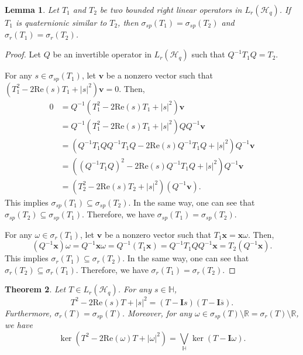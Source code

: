 \documentclass[pdflatex,sn-mathphys-num]{sn-jnl}%
\theoremstyle{thmstyleone}%
\newtheorem{theorem}{Theorem}%
\theoremstyle{thmstyletwo}%
\theoremstyle{thmstylethree}%
\newtheorem{lemma}{Lemma}%
\newtheorem{theorem}{Theorem}[section]
\newtheorem{lemma}[theorem]{Lemma}
\theoremstyle{definition}
\theoremstyle{remark}
\begin{document}
\begin{lemma}
	Let $T_1$ and $T_2$ be two bounded right linear operators in $L_r(\mathcal{H}_q)$. If $T_1$ is quaternionic similar to $T_2$, then
    $\sigma_{sp}(T_1)=\sigma_{sp}(T_2)$ and $\sigma_r(T_1)=\sigma_r(T_2)$.
	\end{lemma}
	
	\begin{proof}
	Let $Q$ be an invertible operator in $L_r(\mathcal{H}_q)$ such that $Q^{-1}T_1Q=T_2$.
	
	For any $s\in\sigma_{sp}(T_1)$, let	 $\boldsymbol{v}$ be a nonzero vector
	such that $(T_1^2-2\mathrm{Re}(s)T_1+|s|^2)\boldsymbol{v}=0$. Then,
	\[
	\begin{aligned}
0&=Q^{-1}(T_1^2-2\mathrm{Re}(s)T_1+|s|^2)\boldsymbol{v}\\
&=Q^{-1}(T_1^2-2\mathrm{Re}(s)T_1+|s|^2)QQ^{-1}\boldsymbol{v}\\
&=(Q^{-1}T_1QQ^{-1}T_1Q-2\mathrm{Re}(s)Q^{-1}T_1Q+|s|^2)Q^{-1}\boldsymbol{v}\\
&=((Q^{-1}T_1Q)^2-2\mathrm{Re}(s)Q^{-1}T_1Q+|s|^2)Q^{-1}\boldsymbol{v} \\
&=(T_2^2-2\mathrm{Re}(s)T_2+|s|^2)(Q^{-1}\boldsymbol{v}).
\end{aligned}
\]
This implies $\sigma_{sp}(T_1)\subseteq\sigma_{sp}(T_2)$. In the same way, one can see that $\sigma_{sp}(T_2)\subseteq\sigma_{sp}(T_1)$.
Therefore, we have $\sigma_{sp}(T_1)=\sigma_{sp}(T_2)$.

For any $\omega\in\sigma_r(T_1)$, let $\boldsymbol{v}$ be a nonzero vector such that $T_1\boldsymbol{x}=\boldsymbol{x}\omega$. Then,
\[
(Q^{-1}\boldsymbol{x})\omega=Q^{-1}\boldsymbol{x}\omega=Q^{-1}(T_1\boldsymbol{x})=Q^{-1}T_1QQ^{-1}\boldsymbol{x}
=T_2(Q^{-1}\boldsymbol{x}).
\]
This implies  $\sigma_{r}(T_1)\subseteq\sigma_{r}(T_2)$. In the same way, one can see that $\sigma_{r}(T_2)\subseteq\sigma_{r}(T_1)$.
Therefore, we have $\sigma_{r}(T_1)=\sigma_{r}(T_2)$.
	\end{proof}




	\begin{theorem}\label{RSPE}
	Let $T\in L_r(\mathcal{H}_q)$. For any $s\in\mathbb{H}$,
	\[
	T^2-2\mathrm{Re}(s)T+|s|^2=(T-\mathbf{I}s)(T-\mathbf{I}\overline{s}).
	\]
	Furthermore, $\sigma_r(T)=\sigma_{sp}(T)$. Moreover, for any $\omega\in\sigma_{sp}(T)\setminus\mathbb{R}=\sigma_r(T)\setminus\mathbb{R}$, we have
\[
\ker(T^2-2\mathrm{Re}(\omega)T+|\omega|^2)=\bigvee_{\mathbb{H}} \ker(T-\boldsymbol{I}\omega).
\]
	\end{theorem}
	
\end{document}
